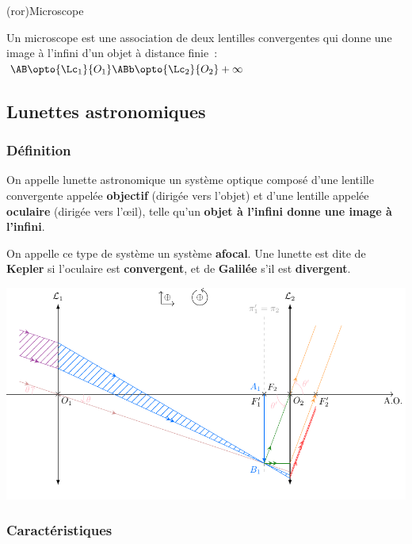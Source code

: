 \documentclass[../../main/main.tex]{subfiles}
\begin{document}
\begin{tcb}[label=ror:microscope, hand](ror){Microscope}

	Un microscope est une association de deux lentilles convergentes qui donne
	une image à l'infini d'un objet à distance finie~: $\AB \opto{\Lc_1}{O_1}
		\ABb \opto{\Lc_2}{O_2} +\infty$
\end{tcb}

\subsection{Lunettes astronomiques}
\subsubsection{Définition}

On appelle lunette astronomique un système optique composé d'une lentille
convergente appelée \textbf{objectif} (dirigée vers l'objet) et d'une
lentille appelée \textbf{oculaire} (dirigée vers l'œil), telle qu'un
\textbf{objet à l'infini donne une image à l'infini}.

On appelle ce type de système un système \textbf{afocal}. Une lunette est dite
de \textbf{Kepler} si l'oculaire est \textbf{convergent}, et de
\textbf{Galilée} s'il est \textbf{divergent}.

\begin{center}
	\includegraphics[width=\linewidth]{kepler}
	\label{fig:kepler}
\end{center}

\subsubsection{Caractéristiques}
\end{document}
